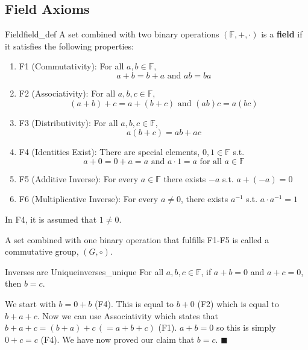 \documentclass[11pt, letterpaper, openany]{book}
\renewenvironment{proof}[1][\proofname]{%
  \tcolorbox[blanker, breakable, left=1em,
    before skip=1em, after skip=1em,
    borderline west={2pt}{0pt}{MagicTeal!50},
    colback=MagicCream,
    before upper={\textcolor{MagicTeal}{\sffamily\bfseries #1.}\space}
  ]%
}{%
  \hfill\textcolor{MagicTeal}{\ensuremath{\blacksquare}}\endtcolorbox%
}
\begin{document}
\subsection{Field Axioms}
\begin{defn}{Field}{field_def}
A set combined with two binary operations $(\mathbb{F}, +, \cdot)$ is a \textbf{field} if it satisfies the following properties: 
\begin{enumerate}
    \item F1 (Commutativity): For all $a,b\in\mathbb{F}$, $$a+b=b+a\text{ and }ab=ba$$
    \item F2 (Associativity): For all $a,b,c\in\mathbb{F}$, $$(a+b)+c=a+(b+c)\text{ and } (ab)c=a(bc)$$
    \item F3 (Distributivity): For all $a,b,c\in\mathbb{F}$, $$a(b+c)=ab+ac$$
    \item F4 (Identities Exist): There are special elements, $0,1\in\mathbb{F}$ s.t. $$a+0=0+a=a\text{ and }a\cdot1=a\text{ for all }a\in\mathbb{F}$$
    \item F5 (Additive Inverse): For every $a\in\mathbb{F}$ there exists $-a$ s.t. $a+(-a)=0$
    \item F6 (Multiplicative Inverse): For every $a\neq{0}$, there exists $a^{-1}$ s.t. $a\cdot{a^{-1}}=1$
\end{enumerate}
\end{defn}
\begin{remark}
    In F4, it is assumed that $1\neq{0}$. 
\end{remark}
\begin{remark}
    A set combined with one binary operation that fulfills F1-F5 is called a commutative group, $(G,\circ)$. 
\end{remark}

\begin{lem}{Inverses are Unique}{inverses_unique}
For all $a,b,c\in\mathbb{F}$, if $a+b=0$ and $a+c=0$, then $b=c$. 
\end{lem}
\begin{proof}
    We start with $b=0+b$ (F4). This is equal to $b+0$ (F2) which is equal to $b+a+c$. Now we can use Associativity which states that $b+a+c=(b+a)+c\,(=a+b+c)$ (F1). $a+b=0$ so this is simply $0+c=c$ (F4). We have now proved our claim that $b=c$. 
\end{proof}
\end{document}
